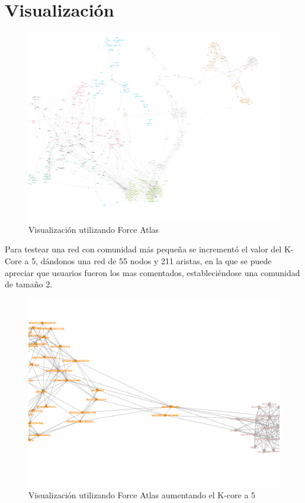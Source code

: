 \section{Visualización}

\begin{figure}[H]
	\centering
	\includegraphics[width=14cm]{../images/atlas}
	\caption{Visualización utilizando Force Atlas}
\end{figure}

Para testear una red con comunidad más pequeña se incrementó el valor del K-Core a 5, dándonos una red de 55 nodos y 211 aristas, en la que se puede apreciar que usuarios fueron los mas comentados, estableciéndose una comunidad de tamaño 2.

\begin{figure}[H]
	\centering
	\includegraphics[width=14cm]{../images/atlas2}
	\caption{Visualización utilizando Force Atlas aumentando el K-core a 5}
\end{figure}


